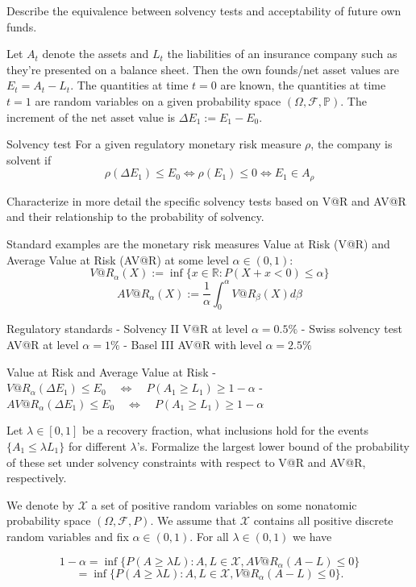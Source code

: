 Describe the equivalence between solvency tests and acceptability of future own
funds.

Let \( A_t \) denote the assets  and \( L_t \) the liabilities of an insurance company such as they're presented on a balance sheet.
Then the own founds/net asset values are \( E_t = A_t - L_t \).
The quantities at time \(t=0\) are known, the quantities at time \(t=1\) are random variables on a given probability space 
\((\Omega, \mathcal{F}, \mathbb{P})\).
The increment of the net asset value is \(\Delta E_1 := E_1 - E_0\).

Solvency test
For a given regulatory monetary risk measure \(\rho\), the company is solvent if
\[\rho(\Delta E_1) \leq E_0 \Leftrightarrow \rho(E_1) \leq 0 \Leftrightarrow E_1 \in A_{\rho}\]

Characterize in more detail the specific solvency tests based on V@R and AV@R
and their relationship to the probability of solvency.

Standard examples are the monetary risk measures Value at Risk (V@R) and Average Value at Risk (AV@R) at some level \(\alpha \in (0,1)\):
\[V@R_{\alpha}(X) := \inf \{ x \in \mathbb{R} : P(X+x<0) \leq \alpha \}\]
\[AV@R_{\alpha}(X) := \frac{1}{\alpha} \int_0^{\alpha} V@R_{\beta}(X) d\beta\]

Regulatory standards
- Solvency II \quad V@R at level \(\alpha = 0.5\%\)
- Swiss solvency test \quad AV@R at level \(\alpha = 1\%\)
- Basel III \quad AV@R with level \(\alpha = 2.5\%\)

Value at Risk and Average Value at Risk
- \(V@R_{\alpha}(\Delta E_1) \leq E_0 \quad \Leftrightarrow \quad P(A_1 \geq L_1) \geq 1-\alpha\)
- \(AV@R_{\alpha}(\Delta E_1) \leq E_0 \quad \Leftrightarrow \quad P(A_1 \geq L_1) \geq 1-\alpha\)


Let \( λ ∈ [0, 1] \) be a recovery fraction, what inclusions hold for the events \( \{A_1 \leq \lambda L_1\}\)
for different \( \lambda \)'s. Formalize the largest lower bound of the probability of these set
under solvency constraints with respect to V@R and AV@R, respectively.

We denote by \(\mathcal{X}\) a set of positive random variables on some nonatomic probability space \((\Omega, \mathcal{F}, P)\). 
We assume that \(\mathcal{X}\) contains all positive discrete random variables and fix \(\alpha \in (0,1)\).
For all \(\lambda \in (0,1)\) we have

\[1 - \alpha = \inf \{ P(A \geq \lambda L) : A, L \in \mathcal{X}, AV@R_{\alpha}(A-L) \leq 0 \}\]
\[= \inf \{ P(A \geq \lambda L) : A, L \in \mathcal{X}, V@R_{\alpha}(A-L) \leq 0 \}.\]


